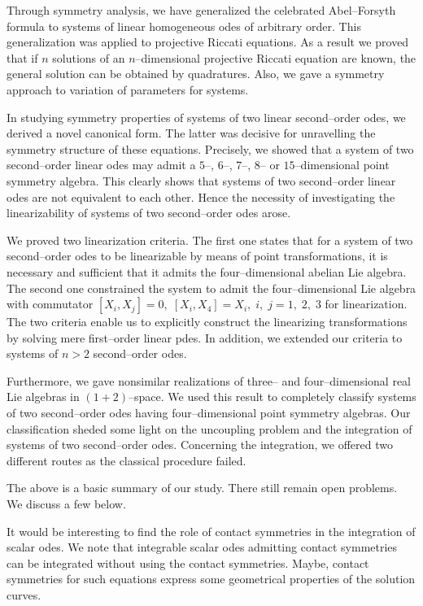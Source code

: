 Through symmetry analysis, we have generalized the celebrated Abel--Forsyth
formula to systems of linear homogeneous odes of arbitrary order.
This generalization was applied to projective Riccati equations. As
a result we proved that if $n$ solutions of an $n$--dimensional projective
Riccati equation are known, the general solution can be obtained by quadratures.
Also, we gave a symmetry approach to variation of parameters for
systems.

In studying symmetry properties of systems of two linear second--order odes,
we derived a novel canonical form. The latter was decisive for unravelling
the symmetry structure of these equations. Precisely, we showed that a system
of two second--order linear odes  may admit a $5$--, $6$--, $7$--, $8$-- or
$15$--dimensional point symmetry algebra. This clearly shows that systems
of two second--order linear odes are not equivalent to each other. Hence the
necessity of investigating the linearizability of systems of two
second--order odes arose.

We proved  two linearization criteria. The first one states that for a system
of two second--order odes to be linearizable by means of point transformations,
it is necessary and sufficient that it admits the four--dimensional abelian
Lie algebra. The second one constrained the system to admit
the four--dimensional  Lie algebra with commutator $[X_i,X_j]=0,\;
[X_i, X_4]=X_i,\; i,\;j=1,\;2,\;3$ for linearization. The two criteria
enable us to explicitly construct the linearizing transformations by solving
mere first--order linear pdes. In addition, we extended our criteria
to systems of $n > 2$ second--order odes.

Furthermore, we gave nonsimilar realizations  of three--
and four--dimensional real Lie algebras in $(1+2)$--space. We used this
result to completely classify 
systems of two second--order odes having four--dimensional point symmetry
algebras. Our classification sheded some light on the uncoupling problem and
the integration
of systems of two second--order odes. Concerning the integration, we offered
two different routes as the classical procedure failed.


The above is a basic summary of our study. There still remain open problems.
We discuss a few below. 

It would be interesting to find the role of contact symmetries in the
integration  of scalar odes. We note that integrable scalar odes
admitting contact symmetries can be integrated without using the
contact symmetries. Maybe, contact symmetries for such equations 
express some geometrical properties of the solution curves.

